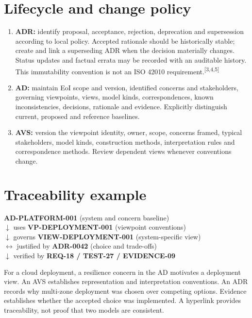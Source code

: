 \documentclass[10pt,letterpaper]{article}
\begin{document}
\section{Lifecycle and change policy}
\begin{enumerate}
\item \textbf{ADR:} identify proposal, acceptance, rejection, deprecation
and supersession according to local policy. Accepted rationale should be
historically stable; create and link a superseding ADR when the decision
materially changes. Status updates and factual errata may be recorded
with an auditable history. This immutability convention is not an
ISO 42010 requirement.\textsuperscript{[3,4,5]}
\item \textbf{AD:} maintain EoI scope and version, identified concerns
and stakeholders, governing viewpoints, views, model kinds,
correspondences, known inconsistencies, decisions, rationale and
evidence. Explicitly distinguish current, proposed and reference baselines.
\item \textbf{AVS:} version the viewpoint identity, owner, scope,
concerns framed, typical stakeholders, model kinds, construction
methods, interpretation rules and correspondence methods. Review
dependent views whenever conventions change.
\end{enumerate}

\section{Traceability example}
\begin{principle}
\centering\sffamily\small
\textbf{AD-PLATFORM-001} (system and concern baseline)\\
$\downarrow$ uses \quad \textbf{VP-DEPLOYMENT-001} (viewpoint conventions)\\
$\downarrow$ governs \quad \textbf{VIEW-DEPLOYMENT-001} (system-specific view)\\
$\leftrightarrow$ justified by \quad \textbf{ADR-0042} (choice and trade-offs)\\
$\downarrow$ verified by \quad \textbf{REQ-18 / TEST-27 / EVIDENCE-09}
\end{principle}
For a cloud deployment, a resilience concern in the AD motivates a deployment
view. An AVS establishes representation and interpretation conventions. An ADR
records why multi-zone deployment was chosen over competing options. Evidence
establishes whether the accepted choice was implemented. A hyperlink
provides traceability, not proof that two models are consistent.
\end{document}
